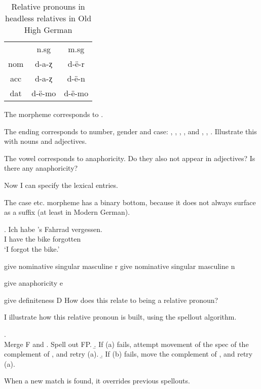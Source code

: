 \begin{table}[H]\label{tbl:paradigmohg}
 \center
 \caption {Relative pronouns in headless relatives in Old High German }
  \begin{tabular}{ccc}
  \toprule
              & \ac{n}.\ac{sg}  & \ac{m}.\ac{sg} \\
        \cmidrule{2-3}
    \ac{nom}  & d-a-ȥ           & d-ë-r          \\
    \ac{acc}  & d-a-ȥ           & d-ë-n          \\
    \ac{dat}  & d-ë-mo          & d-ë-mo         \\
    \bottomrule
  \end{tabular}
\end{table}




The  morpheme corresponds to .

The ending corresponds to number, gender and case: , , , ,  and , , . Illustrate this with nouns and adjectives.

The vowel corresponds to anaphoricity.
Do they also not appear in adjectives? Is there any anaphoricity?

Now I can specify the lexical entries.

The case etc. morpheme has a binary bottom, because it does not always surface as a suffix (at least in Modern German).

\exg. Ich habe 's Fahrrad vergessen.\\
 I have the bike forgotten\\
 `I forgot the bike.'

give nominative singular masculine r
give nominative singular masculine n

give anaphoricity e

give definiteness D How does this relate to being a relative pronoun?

I illustrate how this relative pronoun is built, using the spellout algorithm.

\ex. \\
Merge F and \label{ex:spellout}
 \a. Spell out FP.
 \b. If (a) fails, attempt movement of the spec of the complement of , and retry (a).
 \b. If (b) fails, move the complement of , and retry (a).

When a new match is found, it overrides previous spellouts.

